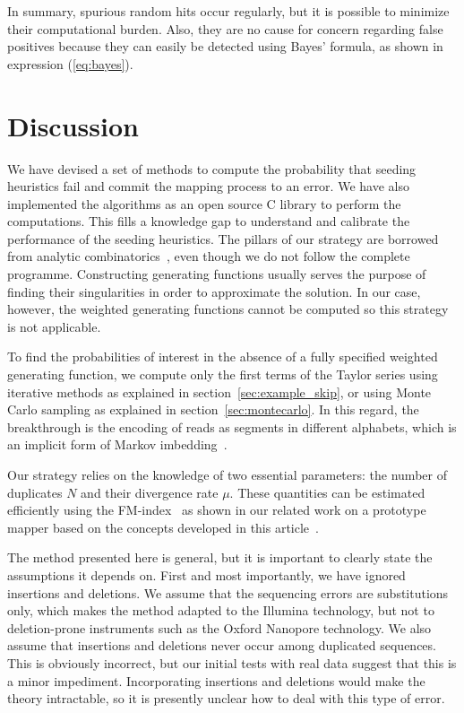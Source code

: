 \documentclass{article}
\begin{document}
In summary, spurious random hits occur regularly, but it is possible to
minimize their computational burden. Also, they are no cause for concern
regarding false positives because they can easily be detected using Bayes'
formula, as shown in expression (\ref{eq:bayes}).


\section{Discussion}
\label{sec_disc}

We have devised a set of methods to compute the probability that seeding
heuristics fail and commit the mapping process to an error. We have also
implemented the algorithms as an open source C library to perform the
computations. This fills a knowledge gap to understand and calibrate the
performance of the seeding heuristics. The pillars of our strategy are
borrowed from analytic combinatorics~\cite{flajolet2009analytic,
sedgewick2013introduction, regnier2000unified, nicodeme2002motif}, even
though we do not follow the complete programme. Constructing generating
functions usually serves the purpose of finding their singularities in
order to approximate the solution. In our case, however, the weighted
generating functions cannot be computed so this strategy is not
applicable.

To find the probabilities of interest in the absence of a fully specified
weighted generating function, we compute only the first terms of the
Taylor series using iterative methods as explained in
section~\ref{sec:example_skip}, or using Monte Carlo sampling as explained
in section~\ref{sec:montecarlo}. In this regard, the breakthrough is the
encoding of reads as segments in different alphabets, which is an implicit
form of Markov imbedding~\cite{fu1994distribution}.

Our strategy relies on the knowledge of two essential parameters: the
number of duplicates $N$ and their divergence rate $\mu$. These quantities
can be estimated efficiently using the
FM-index~\cite{ferragina2005indexing} as shown in our related work on a
prototype mapper based on the concepts developed in this
article~\cite{zorita2020mapping}.

The method presented here is general, but it is important to clearly state
the assumptions it depends on. First and most importantly, we have ignored
insertions and deletions. We assume that the sequencing errors are
substitutions only, which makes the method adapted to the Illumina
technology, but not to deletion-prone instruments such as the Oxford
Nanopore technology. We also assume that insertions and deletions never
occur among duplicated sequences. This is obviously incorrect, but our
initial tests with real data suggest that this is a minor impediment.
Incorporating insertions and deletions would make the theory intractable,
so it is presently unclear how to deal with this type of error.
\end{document}
